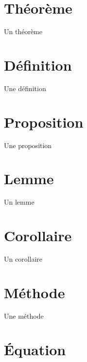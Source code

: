 \documentclass[12pt]{bristol}
\begin{document}
\section{Théorème}
\label{sec:thm}
\begin{thmbox}{Un théorème}
\lipsum[1][1-2]
\end{thmbox}
\section{Définition}
\begin{defbox}{Une définition}
\lipsum[1][1-2]
\end{defbox}
\section{Proposition}
\begin{prpbox}{Une proposition}
\lipsum[1][1-2]
\end{prpbox}
\section{Lemme}
\begin{lembox}{Un lemme}
\lipsum[1][1-2]
\end{lembox}
\section{Corollaire}
\begin{corbox}{Un corollaire}
\lipsum[1][1-2]
\end{corbox}
\section{Méthode}
\begin{mtdbox}{Une méthode}
\lipsum[1][1-2]
\end{mtdbox}
\section{\'Equation}
\end{document}
